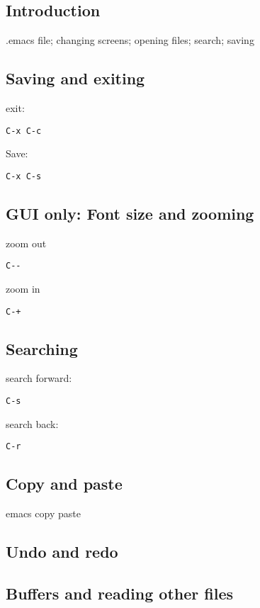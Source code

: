 
\subsection{Introduction}
 
.emacs file; changing screens; opening files; search; saving

\subsection{Saving and exiting}

exit:
\begin{verbatim}
C-x C-c
\end{verbatim}
Save:
\begin{verbatim}
C-x C-s
\end{verbatim}


\subsection{GUI only: Font size and zooming}

zoom out
\begin{verbatim}
C--
\end{verbatim}
zoom in
\begin{verbatim}
C-+
\end{verbatim}



\subsection{Searching}

search forward:
\begin{verbatim}
C-s
\end{verbatim}

search back:
\begin{verbatim}
C-r
\end{verbatim}


\subsection{Copy and paste}
emacs copy paste


\subsection{Undo and redo}

\subsection{Buffers and reading other files}

